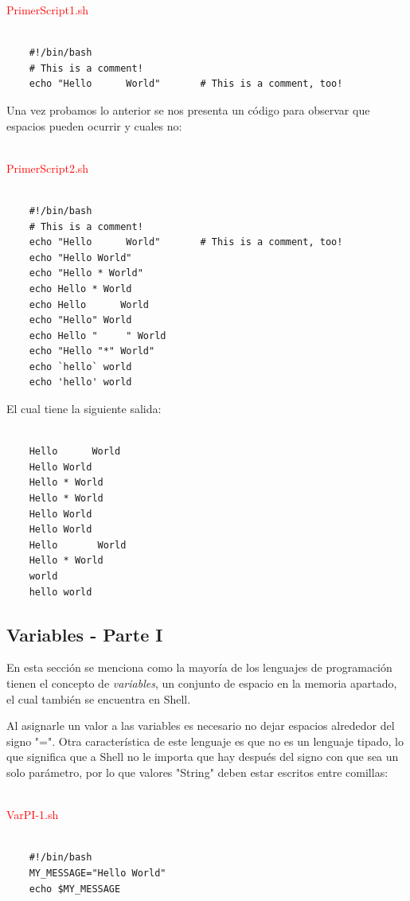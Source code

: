 \documentclass{article}
\begin{document}
\textcolor{red}{PrimerScript1.sh}
\begin{framed}
\begin{verbatim}
	
    #!/bin/bash
    # This is a comment!
    echo "Hello      World"       # This is a comment, too!
\end{verbatim}
\end{framed}

Una vez probamos lo anterior se nos presenta un código para observar que espacios pueden ocurrir y cuales no:

~\\
\textcolor{red}{PrimerScript2.sh}
\begin{framed}
\begin{verbatim}
	
    #!/bin/bash
    # This is a comment!
    echo "Hello      World"       # This is a comment, too!
    echo "Hello World"
    echo "Hello * World"
    echo Hello * World
    echo Hello      World
    echo "Hello" World
    echo Hello "     " World
    echo "Hello "*" World"
    echo `hello` world
    echo 'hello' world
\end{verbatim}
\end{framed}
 
 El cual tiene la siguiente salida:
 
\begin{verbatim}
	
    Hello      World
    Hello World
    Hello * World
    Hello * World
    Hello World
    Hello World
    Hello       World
    Hello * World
    world
    hello world
\end{verbatim}

\subsection{Variables - Parte I}

En esta sección se menciona como la mayoría de los lenguajes de programación tienen el concepto de \textit{variables}, un conjunto de espacio en la memoria apartado, el cual también se encuentra en Shell.

Al asignarle un valor a las variables es necesario no dejar espacios alrededor del signo "=". Otra característica de este lenguaje es que no es un lenguaje tipado, lo que significa que a Shell no le importa que hay después del signo con que sea un solo parámetro, por lo que valores "String" deben estar escritos entre comillas:

~\\
\textcolor{red}{VarPI-1.sh}
\begin{framed}
\begin{verbatim}
	
    #!/bin/bash
    MY_MESSAGE="Hello World"
    echo $MY_MESSAGE
\end{verbatim}
\end{framed}
\end{document}
